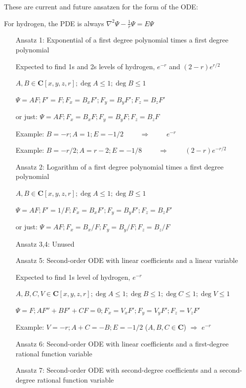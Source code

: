 \documentclass{article}
\begin{document}
These are current and future ansatzen for the form of the ODE:

For hydrogen, the PDE is always $\nabla^2 \Psi - \frac{1}{r} \Psi = E \Psi$

\begin{itemize}
\item[Ansatz 1:] Exponential of a first degree polynomial times a first degree polynomial

Expected to find 1s and 2s levels of hydrogen, $e^{-r}$ and $(2-r)e^{r/2}$

$A,B \in \mathbf{C}[x,y,z,r]; \deg A \le 1; \deg B \le 1$

$\Psi = A F; F' = F; F_x = B_x F'; F_y = B_y F'; F_z = B_z F'$

or just: $\Psi = A F; F_x = B_x F; F_y = B_y F; F_z = B_z F$

Example: $B=-r; A=1; E=-1/2$ $\qquad\Rightarrow\qquad$ $e^{-r}$

Example: $B=-r/2; A=r-2; E=-1/8$ $\qquad\Rightarrow\qquad$ $(2-r)e^{-r/2}$

\item[Ansatz 2:] Logarithm of a first degree polynomial times a first degree polynomial

$A,B \in \mathbf{C}[x,y,z,r]; \deg A \le 1; \deg B \le 1$

$\Psi = A F; F' = 1/F; F_x = B_x F'; F_y = B_y F'; F_z = B_z F'$

or just: $\Psi = A F; F_x = B_x / F; F_y = B_y / F; F_z = B_z / F$

\item[Ansatz 3,4:] Unused

\item[Ansatz 5:] Second-order ODE with linear coefficients and a linear variable

Expected to find 1s level of hydrogen, $e^{-r}$

$A,B,C,V \in \mathbf{C}[x,y,z,r]; \deg A \le 1; \deg B \le 1; \deg C \le 1; \deg V \le 1$

$\Psi = F; A F'' + B F' + C F = 0; F_x = V_x F'; F_y = V_y F'; F_z = V_z F'$

Example: $V=-r; A+C=-B; E=-1/2$ ($A, B, C \in \mathbf{C}$) $\Rightarrow$ $e^{-r}$

\item[Ansatz 6:] Second-order ODE with linear coefficients and a first-degree rational function variable

\item[Ansatz 7:] Second-order ODE with second-degree coefficients and a second-degree rational function variable


\end{itemize}
\end{document}
